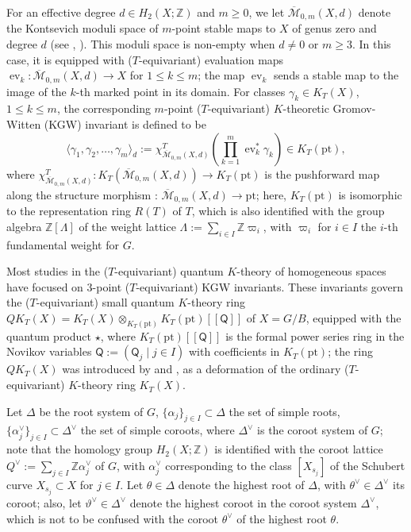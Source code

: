 \documentclass[11pt,a4paper,reqno,dvipdfmx]{amsart}
\numberwithin{equation}{section}
\newcommand{\BZ}{\mathbb{Z}}
\newcommand{\CM}{\mathcal{M}}
\newcommand{\sQ}{\mathsf{Q}}
\DeclareMathOperator{\ev}{ev}
\newcommand{\pt}{\mathrm{pt}}
\newcommand{\ol}[1]{\overline{#1}}
\newcommand{\bra}[1]{[\![#1]\!]}
\theoremstyle{plain}
\theoremstyle{definition}
\theoremstyle{remark}
\begin{document}
For an effective degree $d \in H_2(X; \BZ)$ and $m\geq 0$, 
we let $\ol{\CM}_{0,m}(X,d)$ denote 
the Kontsevich moduli space of $m$-point stable maps to 
$X$ of genus zero and degree $d$ (see \cite{FP}, \cite{Tho}). 
This moduli space is non-empty when $d\neq 0$ or $m\geq 3$. 
In this case, it is equipped with ($T$-equivariant) evaluation maps 
$\ev_k:\ol{\CM}_{0,m}(X,d)\to X$ for $1 \leq k\leq m$; 
the map $\ev_k$ sends a stable map to the image of the $k$-th marked point 
in its domain. For classes 
$\gamma_k \in K_{T}(X)$, $1 \leq k \leq m$, 
the corresponding $m$-point ($T$-equivariant) 
$K$-theoretic Gromov-Witten (KGW) invariant is defined to be
%
\begin{equation*}
\langle \gamma_1, \gamma_2, \ldots , \gamma_m \rangle_d := 
\chi^{T}_{\ol{\CM}_{0,m}(X,d)}\left(\prod_{k=1}^m\ev_k^*\gamma_k \right) 
\in K_{T}(\pt), 
\end{equation*}
%
where $\chi^{T}_{\ol{\CM}_{0,m}(X,d)} : K_{T}(\ol{\CM}_{0,m}(X,d)) \to K_{T}(\pt)$ is 
the pushforward map along the structure morphism : $\ol{\CM}_{0,m}(X,d) \to \pt$; 
here, $K_{T}(\pt)$ is isomorphic to the representation ring $R(T)$ of $T$, 
which is also identified with the group algebra $\BZ[\Lambda]$ of 
the weight lattice $\Lambda := \sum_{i \in I} \BZ \varpi_i$, 
with $\varpi_i$ for $i \in I$ the $i$-th fundamental weight for $G$. 

Most studies in the ($T$-equivariant) quantum $K$-theory of 
homogeneous spaces have focused on $3$-point ($T$-equivariant) KGW invariants. 
These invariants govern the ($T$-equivariant) small quantum $K$-theory ring 
$QK_T(X) = K_T(X) \otimes_{K_T(\pt)} K_T(\pt)\bra{\sQ}$ of $X = G/B$, 
equipped with the quantum product $\star$, 
where $K_{T}(\pt)\bra{\sQ}$ is the formal power series ring 
in the Novikov variables $\sQ:=(\sQ_j \mid j \in I)$ 
with coefficients in $K_{T}(\pt)$; the ring $QK_{T}(X)$ was 
introduced by \cite{Giv} and \cite{Lee}, as a deformation of 
the ordinary ($T$-equivariant) $K$-theory ring $K_T(X)$. 

Let $\Delta$ be the root system of $G$, 
$\bigl\{ \alpha_j \bigr\}_{j \in I} \subset \Delta$ 
the set of simple roots, $\bigl\{ \alpha_j^{\vee} \bigr\}_{j \in I} \subset \Delta^{\vee}$ 
the set of simple coroots, where $\Delta^{\vee}$ is the coroot system of $G$; 
note that the homology group $H_2(X; \BZ)$ is 
identified with the coroot lattice $Q^{\vee} := 
\sum_{j \in I} \BZ \alpha_j^{\vee}$ of $G$, 
with $\alpha_j^{\vee}$ corresponding to 
the class $[X_{s_j}]$ of the Schubert curve $X_{s_j} \subset X$ for $j \in I$. 
Let $\theta \in \Delta$ denote the highest root of $\Delta$, 
with $\theta^{\vee} \in \Delta^{\vee}$ its coroot; 
also, let $\vartheta^{\vee} \in \Delta^{\vee}$ denote 
the highest coroot in the coroot system $\Delta^{\vee}$, 
which is not to be confused with the coroot $\theta^{\vee}$ 
of the highest root $\theta$. 
\end{document}
